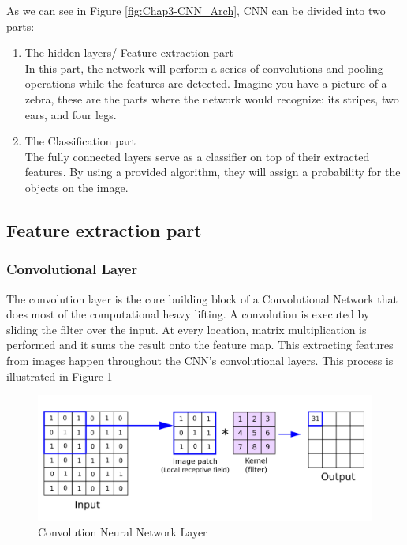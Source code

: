 As we can see in Figure \ref{fig:Chap3-CNN_Arch}, CNN can be divided into two parts:
\begin{enumerate}
	\item The hidden layers/ Feature extraction part\\
	In this part, the network will perform a series of convolutions and pooling operations while the features are detected. Imagine you have a picture of a zebra, these are the parts where the
	network would recognize: its stripes, two ears, and four legs.
	\item The Classification part\\
	The fully connected layers serve as a classifier on top of their extracted features. By using a provided algorithm, they will assign a probability for the objects on the image.
\end{enumerate}

\subsection{Feature extraction part}
\subsubsection{Convolutional Layer}

The convolution layer is the core building block of a Convolutional Network that does most of the computational heavy lifting. A convolution is executed by sliding the filter over the input. At every location, matrix multiplication is performed and it sums the result onto the feature map. This extracting features from images happen throughout the CNN's convolutional layers. This process is illustrated in Figure \ref{fig:Chap3-CNN_Layer}

\begin{figure}[H]
	\centering
	\includegraphics[width=\textwidth]{img/Chap3/ConvLayer}
	\caption{Convolution Neural Network Layer}
	\label{fig:Chap3-CNN_Layer}
\end{figure}

